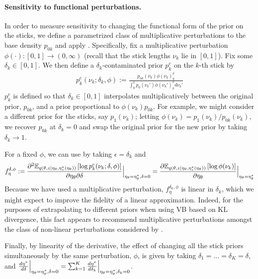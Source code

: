 

\paragraph{Sensitivity to functional perturbations.}
%
In order to measure sensitivity to changing the functional form of the prior on
the sticks, we define a parametrized class of multiplicative perturbations to
the base density $p_{0k}$ and apply .
Specifically, fix a multiplicative perturbation $\phi(\cdot): [0, 1] \rightarrow
(0, \infty)$ (recall that the stick lengths $\nu_k$  lie in $[0, 1]$). Fix some
$\delta_k\in[0, 1]$.  We then define a $\delta_k$-contaminated prior $p^c_{k}$ on
the $k$-th stick by
%
\begin{align}
\label{eq:expon_perturb}
	p^c_{k}(\nu_k ; \delta_k, \phi) :=
  \frac{p_{0k}(\nu_k)\phi(\nu_k)^\delta_k}
       {\int_0^1 p_0(\nu_k')\phi(\nu_k')^\delta_k d\nu_k'}
\end{align}
%
$p^c_{k}$ is defined so that $\delta_k\in[0, 1]$ interpolates multiplicatively
between the original prior, $p_{0k}$, and a prior proportional to
$\phi(\nu_k)p_{0k}$. For example, we might consider a different prior for the
sticks, say $p_1(\nu_k)$; letting $\phi(\nu_k) = p_1(\nu_k) / p_{0k}(\nu_k)$, we
recover $p_{0k}$ at $\delta_k = 0$ and swap the original prior for the new prior
by taking $\delta_k \rightarrow 1$.

For a fixed $\phi$, we can use  by taking
$\epsilon = \delta_k$ and
%
\begin{align*}
f^{\delta,\phi}_\eta :=
\frac{\partial^2
    \mathbb{E}_{q\left(\theta, z \vert \eta_\theta, \eta_z^{*}(\eta_\theta)\right)} \left[ \log p^c_{k}(\nu_k ; \delta, \phi) \right]}
{\partial \eta_\theta \partial \delta}
    \Big\rvert_{\eta_\theta = \eta_\theta^{*}, \delta = 0} =
\frac{\partial
    \mathbb{E}_{q\left(\theta, z \vert \eta_\theta, \eta_z^{*}(\eta_\theta)\right)} \left[ \log\phi(\nu_k) \right]}
{\partial \eta_\theta}
    \Big\rvert_{\eta_\theta = \eta_\theta^{*}}
\end{align*}
%
Because we have used a multiplicative perturbation, $f^{\delta_k, \phi}_\eta$
is linear in $\delta_k$, which we might expect to improve the fidelity of a
linear approximation.
%
Indeed, for the purposes of extrapolating to different priors
when using VB based on KL divergence, this
fact appears to recommend multiplicative perturbations amongst the class of
non-linear perturbations considered by \citet{gustafson:1996:localposterior}.

Finally, by linearity of the derivative, the effect of changing all the stick
priors simultaneously by the same perturbation, $\phi$, is given by taking
$\delta_1 = ... = \delta_K = \delta$, and
$\frac{d\eta^{*}}{d\delta} \Big\rvert_{\eta_\theta = \eta_\theta^{*}, \delta=0} =
    \sum_{k=1}^{K} \frac{d\eta^{*}}{d\delta_k}
    \Big\rvert_{\eta_\theta = \eta_\theta^{*}, \delta_k=0}$.
